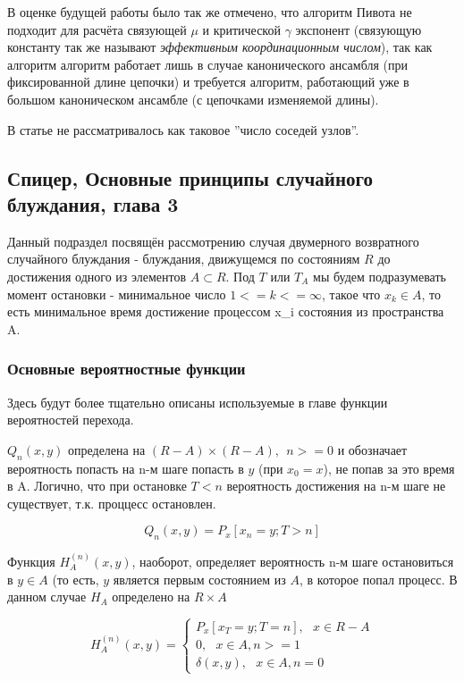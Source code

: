 В оценке будущей работы было так же отмечено, что алгоритм Пивота не подходит для расчёта связующей $\mu$ и критической $\gamma$ экспонент (связующую константу так же называют \textit{эффективным координационным числом}), так как алгоритм алгоритм работает лишь в случае канонического ансамбля (при фиксированной длине цепочки) и требуется алгоритм, работающий уже в большом каноническом ансамбле (с цепочками изменяемой длины).

В статье не рассматривалось как таковое ''число соседей узлов''.


\subsection{Спицер, Основные принципы случайного блуждания, глава 3}

Данный подраздел посвящён рассмотрению случая двумерного возвратного случайного блуждания - блуждания, движущемся по состояниям $R$ до достижения одного из элементов $A \subset R$. Под $T$ или $T_A$ мы будем подразумевать момент остановки - минимальное число $1<= k <= \infty$, такое что $x_k \in A$, то есть минимальное время достижение процессом {x_i} состояния из пространства A.

\subsubsection{Основные вероятностные функции}

Здесь будут более тщательно описаны используемые в главе функции вероятностей перехода.

$Q_n(x,y)$ определена на $(R-A) \times (R-A),\ \ n >= 0$ и обозначает вероятность попасть на n-м шаге попасть в $y$ (при $x_0 = x$), не попав за это время в A. Логично, что при остановке $T<n$ вероятность достижения на n-м шаге не существует, т.к. проццесс остановлен.

\begin{equation}
 Q_n(x,y) = P_x[x_n=y; T>n]
\end{equation}

Функция $H^{(n)}_A(x,y)$, наоборот, определяет вероятность n-м шаге остановиться в $y \in A$ (то есть, $y$ является первым состоянием из $A$, в которое попал процесс. В данном случае $H_A$ определено на $R \times A$

\begin{equation}
H^{(n)}_A(x,y) = 
	\begin{cases}
		P_x[x_T=y; T=n], \ \ \ x \in R-A \\
		0, \ \ \ x \in A, n>=1 \\
		\delta(x,y), \ \ \ x \in A, n=0
	\end{cases}
\end{equation}

